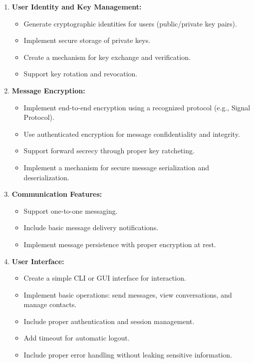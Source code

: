 \documentclass[10pt,a4paper,american]{article}
\begin{document}
\begin{enumerate}
	\item \textbf{User Identity and Key Management:}
	      \begin{itemize}
		      \item Generate cryptographic identities for users (public/private key pairs).
		      \item Implement secure storage of private keys.
		      \item Create a mechanism for key exchange and verification.
		      \item Support key rotation and revocation.
	      \end{itemize}

	\item \textbf{Message Encryption:}
	      \begin{itemize}
		      \item Implement end-to-end encryption using a recognized protocol (e.g., Signal Protocol).
		      \item Use authenticated encryption for message confidentiality and integrity.
		      \item Support forward secrecy through proper key ratcheting.
		      \item Implement a mechanism for secure message serialization and deserialization.
	      \end{itemize}

	\item \textbf{Communication Features:}
	      \begin{itemize}
		      \item Support one-to-one messaging.
		      \item Include basic message delivery notifications.
		      \item Implement message persistence with proper encryption at rest.
	      \end{itemize}

	\item \textbf{User Interface:}
	      \begin{itemize}
		      \item Create a simple CLI or GUI interface for interaction.
		      \item Implement basic operations: send messages, view conversations, and manage contacts.
		      \item Include proper authentication and session management.
		      \item Add timeout for automatic logout.
		      \item Include proper error handling without leaking sensitive information.
	      \end{itemize}
\end{enumerate}
\end{document}
